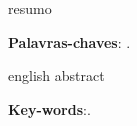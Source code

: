 \begin{folhadeaprovacao}
   \begin{center}
    \vspace*{0.5cm}
    {\large\imprimirlocal}
    \par
    {\large\imprimirdata}
    \vspace*{1cm}
  \end{center}
  
\end{folhadeaprovacao}





\setlength{\absparsep}{18pt} %
\begin{resumo}
resumo
 

 \textbf{Palavras-chaves}: .
 
\end{resumo}

\begin{resumo}[Abstract]
 \begin{otherlanguage*}{english}
 abstract
   \vspace{\onelineskip}
 
   \noindent 
   \textbf{Key-words}:.
 \end{otherlanguage*}
\end{resumo}


